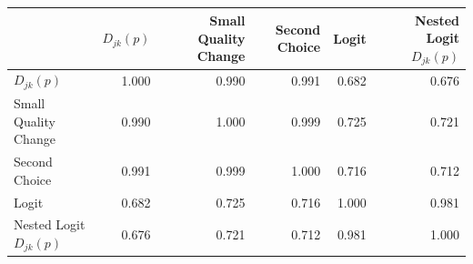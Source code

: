 \begin{tabular}{lrrrrr}
\hline
                            &   $ D_{jk}(p) $ &   Small Quality Change &   Second Choice &   Logit &   Nested Logit $ D_{jk}(p) $ \\
\hline
 $ D_{jk}(p) $              &           1.000 &                  0.990 &           0.991 &   0.682 &                        0.676 \\
 Small Quality Change       &           0.990 &                  1.000 &           0.999 &   0.725 &                        0.721 \\
 Second Choice              &           0.991 &                  0.999 &           1.000 &   0.716 &                        0.712 \\
 Logit                      &           0.682 &                  0.725 &           0.716 &   1.000 &                        0.981 \\
 Nested Logit $ D_{jk}(p) $ &           0.676 &                  0.721 &           0.712 &   0.981 &                        1.000 \\
\hline
\end{tabular}